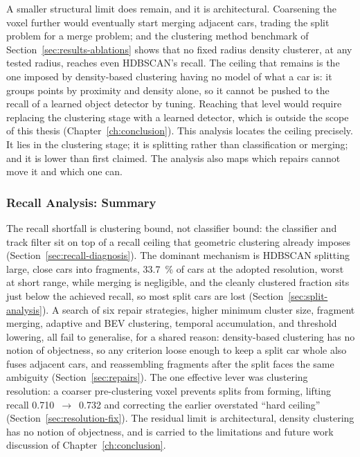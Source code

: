 \documentclass[a4paper,12pt]{report}
\begin{document}
A smaller structural limit does remain, and it is architectural. Coarsening the voxel
further would eventually start merging adjacent cars, trading the split problem for a
merge problem; and the clustering method benchmark of Section~\ref{sec:results-ablations}
shows that no fixed radius density clusterer, at any tested radius, reaches even
HDBSCAN's recall. The ceiling that remains is the one imposed by density-based
clustering having no model of what a car is: it groups points by proximity and
density alone, so it cannot be pushed to the recall of a learned object detector by
tuning. Reaching that level would require replacing the clustering stage with a
learned detector, which is outside the scope of this thesis (Chapter~\ref{ch:conclusion}). This
analysis locates the ceiling precisely. It lies in the clustering stage; it is splitting
rather than classification or merging; and it is lower than first claimed. The analysis
also maps which repairs cannot move it and which one can.

\subsubsection{Recall Analysis: Summary}
\label{sec:recall-summary}

The recall shortfall is clustering bound, not classifier bound: the classifier and
track filter sit on top of a recall ceiling that geometric clustering already imposes
(Section~\ref{sec:recall-diagnosis}). The dominant mechanism is HDBSCAN splitting
large, close cars into fragments, \SI{33.7}{\percent} of cars at the adopted resolution, worst at
short range, while merging is negligible, and the cleanly clustered fraction sits
just below the achieved recall, so most split cars are lost
(Section~\ref{sec:split-analysis}). A search of six repair strategies, higher
minimum cluster size, fragment merging, adaptive and BEV clustering, temporal
accumulation, and threshold lowering, all fail to generalise, for a shared reason:
density-based clustering has no notion of objectness, so any criterion loose enough to
keep a split car whole also fuses adjacent cars, and reassembling fragments after the
split faces the same ambiguity (Section~\ref{sec:repairs}). The one effective lever was clustering
resolution: a coarser pre-clustering voxel prevents splits from forming, lifting
recall \num{0.710}~$\rightarrow$~\num{0.732} and correcting the earlier overstated
``hard ceiling'' (Section~\ref{sec:resolution-fix}). The residual limit is
architectural, density clustering has no notion of objectness, and is carried
to the limitations and future work discussion of Chapter~\ref{ch:conclusion}.
\end{document}
